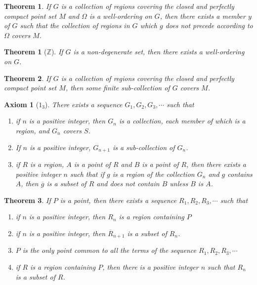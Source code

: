 \documentclass[10pt]{report}
\newtheorem{theorem}{Theorem}
\newtheorem*{theorem*}{Theorem}
\newtheorem*{axiom}{Axiom}
\newcommand{\cl}[1]{\overline{#1}}
\begin{document}
\begin{theorem}
 If $G$ is a collection of regions covering the closed and perfectly compact
point set $M$ and $\Omega$ is a well-ordering on $G$, then there exists a member
$y$ of $G$ such that the collection of regions in $G$ which $g$ does not
precede according to $\Omega$ covers $M$.
\end{theorem}

\begin{theorem*}[$\mathbb{Z}$]
 If $G$ is a non-degenerate set, then there exists a well-ordering on $G$.
\end{theorem*}

\begin{theorem}
 If $G$ is a collection of regions covering the closed and perfectly compact
point set $M$, then some finite sub-collection of $G$ covers $M$.
\end{theorem}

\begin{axiom}[$1_3$]
 There exists a sequence $G_1, G_2, G_3, \cdots$ such that
\begin{enumerate}
 \item if $n$ is a positive integer, then $G_n$ is a collection, each member of
which is a region, and $G_n$ covers $S$.
\item If $n$ is a positive integer, $G_{n+1}$ is a sub-collection of $G_n$.
\item if $R$ is a region, $A$ is a point of $R$ and $B$ is a point of $R$, then
there exists a positive integer $n$ such that if $g$ is a region of the
collection $G_n$ and $g$ contains $A$, then ${\cl{g}}$ is a subset of $R$
and does not contain $B$ unless $B$ is $A$.
\end{enumerate}

\end{axiom}

\begin{theorem}
 If $P$ is a point, then there exists a sequence $R_1,R_2,R_3,\cdots$ such that
\begin{enumerate}
 \item[(i)] if $n$ is a positive integer, then $R_n$ is a region containing $P$
 \item[(ii)] if $n$ is a positive integer, then $\cl{R}_{n+1}$ is a subset of $R_n$.
 \item[(iii)] $P$ is the only point common to all the terms of the sequence $R_1, R_2, R_3, \cdots$
 \item[(iv)] if $R$ is a region containing $P$, then there is a positive integer $n$ such that $R_n$
is a subset of $R$.
\end{enumerate}
\end{theorem}
\end{document}
